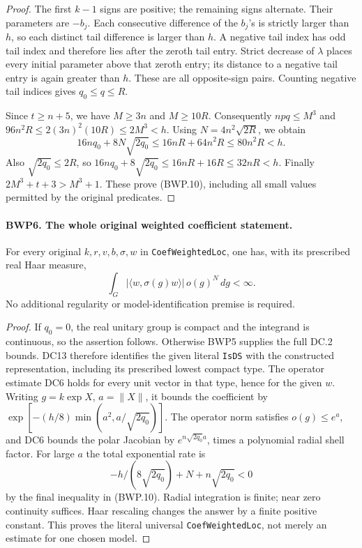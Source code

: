 \begin{proof}
The first \(k-1\) signs are positive; the remaining signs alternate.
Their parameters are \(-b_j\).  Each consecutive difference of
the \(b_j\)'s is strictly larger than \(h\), so each distinct
tail difference is larger than \(h\).  A negative tail index has
odd tail index and therefore lies after the zeroth tail entry.
Strict decrease of \(\lambda\) places every initial parameter
above that zeroth entry; its distance to a negative tail entry is
again greater than \(h\).  These are all opposite-sign pairs.
Counting negative tail indices gives \(q_0\le q\le R\).

Since \(t\ge n+5\), we have \(M\ge3n\) and \(M\ge10R\).
Consequently \(npq\le M^3\) and
\(96n^2R\le2(3n)^2(10R)\le2M^3<h\).
Using \(N=4n^2\sqrt{2R}\), we obtain
\[
 16nq_0+8N\sqrt{2q_0}
 \le16nR+64n^2R\le80n^2R<h.
\]
Also \(\sqrt{2q_0}\le2R\), so
\(16nq_0+8\sqrt{2q_0}\le16nR+16R\le32nR<h\).
Finally \(2M^3+t+3>M^3+1\).  These prove (BWP.10),
including all small values permitted by the original predicates.
\end{proof}

\paragraph{BWP6. The whole original weighted coefficient statement.}
\label{claim:BWP6}
For every original \(k,r,v,b,\sigma,w\) in
\texttt{CoefWeightedLoc}, one has, with its prescribed real Haar measure,
\[
 \int_G |\langle w,\sigma(g)w\rangle|\,o(g)^N\,dg<\infty.
 \tag{BWP.11}
\]
No additional regularity or model-identification premise is required.

\begin{proof}
If \(q_0=0\), the real unitary group is compact and the integrand
is continuous, so the assertion follows.  Otherwise BWP5 supplies
the full DC.2 bounds.  DC13 therefore identifies the given literal
\texttt{IsDS} with the constructed representation, including its
prescribed lowest compact type.  The operator estimate DC6 holds
for every unit vector in that type, hence for the given \(w\).
Writing \(g=k\exp X\), \(a=\|X\|\), it bounds the
coefficient by
\(\exp[-(h/8)\min(a^2,a/\sqrt{2q_0})]\).
The operator norm satisfies \(o(g)\le e^a\), and DC6 bounds the
polar Jacobian by \(e^{n\sqrt{2q_0}a}\), times a polynomial
radial shell factor.  For large \(a\) the total exponential rate is
\[
 -h/(8\sqrt{2q_0})+N+n\sqrt{2q_0}<0
\]
by the final inequality in (BWP.10).  Radial integration is finite;
near zero continuity suffices.  Haar rescaling changes the answer
by a finite positive constant.  This proves the literal universal
\texttt{CoefWeightedLoc}, not merely an estimate for one chosen model.
\end{proof}

